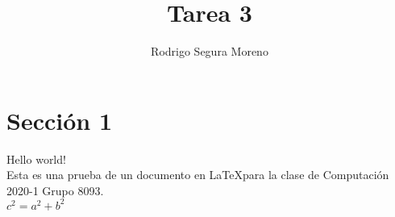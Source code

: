 \documentclass[a4paper,10pt]{article}
\title{Tarea 3} %
\author{Rodrigo Segura Moreno} %
\begin{document}
\maketitle

% 

\section{Sección 1}

Hello world! \\ %

Esta es una prueba de un documento en \LaTeX para la clase de Computación 2020-1 Grupo 8093.\\ %


$ c^{2} = a^{2} + b^{2} $
\end{document}
